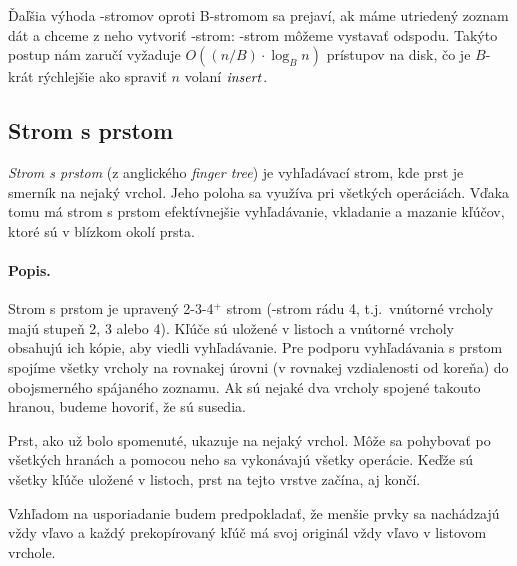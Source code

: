 Ďaľšia výhoda \Bp-stromov oproti B-stromom sa prejaví, ak máme utriedený zoznam dát a chceme z neho vytvoriť \Bp-strom:
\Bp-strom môžeme vystavať odspodu. Takýto postup nám zaručí vyžaduje $O((n/B)\cdot\log_B n)$ prístupov na disk,
čo je $B$-krát rýchlejšie ako spraviť $n$ volaní $\mathop{\mathit{insert}}$.




\subsection{Strom s prstom}
\emph{Strom s prstom} (z anglického \emph{finger tree}) je vyhľadávací strom, kde prst je smerník na nejaký
vrchol. Jeho poloha sa využíva pri všetkých operáciách. Vďaka tomu má strom s prstom efektívnejšie vyhľadávanie,
vkladanie a mazanie kľúčov, ktoré sú v blízkom okolí prsta.

\paragraph{Popis.}
Strom s prstom je upravený 2-3-4$^+$ strom (\Bp-strom rádu 4, t.j.\ vnútorné vrcholy
majú stupeň 2, 3 alebo 4). Kľúče sú uložené v listoch a vnútorné vrcholy
obsahujú ich kópie, aby viedli vyhľadávanie. Pre podporu vyhľadávania
s prstom spojíme všetky vrcholy na rovnakej úrovni (v rovnakej vzdialenosti od koreňa)
do obojsmerného spájaného zoznamu.
Ak sú nejaké dva vrcholy spojené takouto hranou, budeme hovoriť, že sú susedia.

Prst, ako už bolo spomenuté, ukazuje na nejaký vrchol. Môže sa pohybovať po všetkých hranách
a pomocou neho sa vykonávajú všetky operácie. Keďže sú všetky kľúče uložené v listoch, prst
na tejto vrstve začína, aj končí.

Vzhľadom na usporiadanie budem predpokladať, že menšie prvky sa nachádzajú vždy vľavo a každý
prekopírovaný kľúč má svoj originál vždy vľavo v listovom vrchole.


